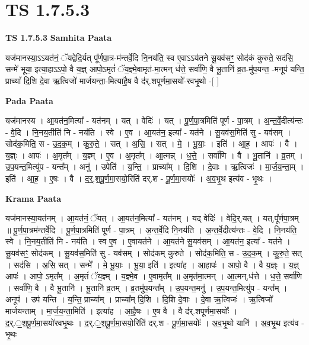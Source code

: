 \documentclass[17pt]{extarticle}
\begin{document}
\section{ TS 1.7.5.3 }

\textbf{TS 1.7.5.3 } \newline
\textbf{Samhita Paata} \newline

यज॑मानस्या॒ऽऽयत॑नं॒ ॅयद्वेदि॒र्यत् पू᳚र्णपा॒त्र-म॑न्तर्वे॒दि नि॒नय॑ति॒ स्व ए॒वाऽऽय॑तने सू॒यव॑सꣳ॒॒ सोद॑कं कुरुते॒ सद॑सि॒ सन्मे॑ भूया॒ इत्या॒हाऽऽपो॒ वै य॒ज्ञ् आपो॒ऽमृतं॑ ॅय॒ज्ञ्मे॒वामृत॑-मा॒त्मन् ध॑त्ते॒ सर्वा॑णि॒ वै भू॒तानि॑ व्र॒त-मु॑प॒यन्त॒ -मनूप॑ यन्ति॒ प्राच्यां᳚ दि॒शि दे॒वा ऋ॒त्विजो॑ मार्जयन्ता॒-मित्या॑है॒ष वै द॑र्.शपूर्णमा॒सयो॑-रवभृ॒थो -[ ] \newline

\textbf{Pada Paata} \newline

यज॑मानस्य । आ॒यत॑न॒मित्या᳚ - यत॑नम् । यत् । वेदिः॑ । यत् । पू॒र्ण॒पा॒त्रमिति॑ पूर्ण - पा॒त्रम् । अ॒न्त॒र्वे॒दीत्य॑न्तः - वे॒दि । नि॒नय॒तीति॑ नि - नय॑ति । स्वे । ए॒व । आ॒यत॑न॒ इत्या᳚ - यत॑ने । सू॒यव॑स॒मिति॑ सु - यव॑सम् । सोद॑क॒मिति॒ स - उ॒द॒क॒म् । कु॒रु॒ते॒ । सत् । अ॒सि॒ । सत् । मे॒ । भू॒याः॒ । इति॑ । आ॒ह॒ । आपः॑ । वै । य॒ज्ञ्ः । आपः॑ । अ॒मृत᳚म् । य॒ज्ञ्म् । ए॒व । अ॒मृत᳚म् । आ॒त्मन्न् । ध॒त्ते॒ । सर्वा॑णि । वै । भू॒तानि॑ । व्र॒तम् । उ॒प॒यन्त॒मित्यु॑प - यन्त᳚म् । अनु॑ । उपेति॑ । य॒न्ति॒ । प्राच्या᳚म् । दि॒शि । दे॒वाः । ऋ॒त्विजः॑ । मा॒र्ज॒य॒न्ता॒म् । इति॑ । आ॒ह॒ । ए॒षः । वै । द॒र्॒.श॒पू॒र्ण॒मा॒सयो॒रिति॑ दर्.श - पू॒र्ण॒मा॒सयोः᳚ । अ॒व॒भृ॒थ इत्य॑व - भृ॒थः ।  \newline


\textbf{Krama Paata} \newline

यज॑मानस्या॒यत॑नम् । आ॒यत॑नं॒ ॅयत् । आ॒यत॑न॒मित्या᳚ - यत॑नम् । यद् वेदिः॑ । वेदि॒र्,यत् । यत्,पू᳚र्णपा॒त्रम् ॥ पू॒र्ण॒पा॒त्रम॑न्तर्वे॒दि । पू॒र्ण॒पा॒त्रमिति॑ पूर्ण - पा॒त्रम् । अ॒न्त॒र्वे॒दि नि॒नय॑ति । अ॒न्त॒र्वे॒दीत्य॑न्तः - वे॒दि । नि॒नय॑ति॒ स्वे । नि॒नय॒तीति॑ नि - नय॑ति । स्व ए॒व । ए॒वायत॑ने । आ॒यत॑ने सू॒यव॑सम् । आ॒यत॑न॒ इत्या᳚ - यत॑ने । सू॒यव॑सꣳ॒॒ सोद॑कम् । सू॒यव॑स॒मिति॑ सु - यव॑सम् । सोद॑कम् कुरुते । सोद॑क॒मिति॒ स - उ॒द॒क॒म् । कु॒रु॒ते॒ सत् । सद॑सि । अ॒सि॒ सत् । सन्मे᳚ । मे॒ भू॒याः॒ । भू॒या॒ इति॑ । इत्या॑ह । आ॒हापः॑ । आपो॒ वै । वै य॒ज्ञ्ः । य॒ज्ञ् आपः॑ । आपो॒ ऽमृत᳚म् । अ॒मृतं॑ ॅय॒ज्ञ्म् । य॒ज्ञ्मे॒व । ए॒वामृत᳚म् ॥ अ॒मृत॑मा॒त्मन् । आ॒त्मन्,ध॑त्ते । ध॒त्ते॒ सर्वा॑णि । सर्वा॑णि॒ वै । वै भू॒तानि॑ । भू॒तानि॑ व्र॒तम् । व्र॒तमु॑प॒यन्त᳚म् । उ॒प॒यन्त॒मनु॑ । उ॒प॒यन्त॒मित्यु॑प - यन्त᳚म् । अनूप॑ । उप॑ यन्ति । य॒न्ति॒ प्राच्या᳚म् । प्राच्या᳚म् दि॒शि । दि॒शि दे॒वाः । दे॒वा ऋ॒त्विजः॑ । ऋ॒त्विजो॑ मार्जयन्ताम् । मा॒र्ज॒य॒न्ता॒मिति॑ । इत्या॑ह । आ॒है॒षः । ए॒ष वै । वै द॑र्.शपूर्णमा॒सयोः᳚ । द॒र्.॒॒श॒पू॒र्ण॒मा॒सयो॑रवभृ॒थः । द॒र्.॒॒श॒पू॒र्ण॒मा॒सयो॒रिति॑ दर्.श - पू॒र्ण॒मा॒सयोः᳚ । अ॒व॒भृ॒थो यानि॑ । अ॒व॒भृ॒थ इत्य॑व - भृ॒थः \newline
\end{document}
